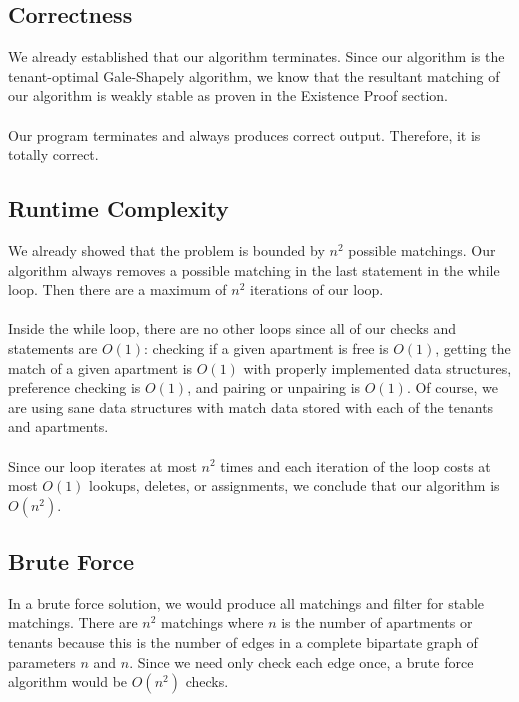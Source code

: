 \documentclass{article}
\begin{document}
\subsection{Correctness}
We already established that our algorithm terminates. Since our algorithm is
the tenant-optimal Gale-Shapely algorithm, we know that the resultant matching
of our algorithm is weakly stable as proven in the Existence Proof section. 
\\\\
Our program terminates and always produces correct output. Therefore, it is 
totally correct.


\subsection{Runtime Complexity}
We already showed that the problem is bounded by $n^2$ possible matchings. Our
algorithm always removes a possible matching in the last statement in the
while loop. Then there are a maximum of $n^2$ iterations of our loop.
\\\\
Inside the while loop, there are no other loops since all of our checks and
statements are $O(1)$: checking if a given apartment is free is $O(1)$,
getting the match of a given apartment is $O(1)$ with properly implemented
data structures, preference checking is $O(1)$, and pairing or unpairing is
$O(1)$. Of course, we are using sane data structures with match data stored
with each of the tenants and apartments.
\\\\
Since our loop iterates at most $n^2$ times and each iteration of the loop
costs at most $O(1)$ lookups, deletes, or assignments, we conclude that our
algorithm is $O(n^2)$.


\subsection{Brute Force}
In a brute force solution, we would produce all matchings and filter for
stable matchings. There are $n^2$ matchings where $n$ is the number of
apartments or tenants because this is the number of edges in a complete
bipartate graph of parameters $n$ and $n$. Since we need only check each
edge once, a brute force algorithm would be $O(n^2)$ checks.
\end{document}
